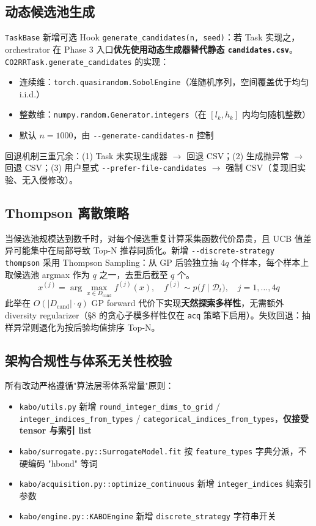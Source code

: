 \documentclass[12pt,a4paper]{article}
\begin{document}
\subsection{动态候选池生成}

\texttt{TaskBase} 新增可选 Hook \texttt{generate\_candidates(n, seed)}：若 Task 实现之，orchestrator 在 Phase 3 入口\textbf{优先使用动态生成器替代静态 \texttt{candidates.csv}}。\texttt{CO2RRTask.generate\_candidates} 的实现：
\begin{itemize}
    \item 连续维：\texttt{torch.quasirandom.SobolEngine}（准随机序列，空间覆盖优于均匀 i.i.d.）
    \item 整数维：\texttt{numpy.random.Generator.integers}（在 $[l_k, h_k]$ 内均匀随机整数）
    \item 默认 $n = 1000$，由 \texttt{-{}-generate-candidates-n} 控制
\end{itemize}

回退机制三重冗余：(1) Task 未实现生成器 $\to$ 回退 CSV；(2) 生成抛异常 $\to$ 回退 CSV；(3) 用户显式 \texttt{-{}-prefer-file-candidates} $\to$ 强制 CSV（复现旧实验、无入侵修改）。

\subsection{Thompson 离散策略}

当候选池规模达到数千时，对每个候选重复计算采集函数代价昂贵，且 UCB 值差异可能集中在局部导致 Top-N 推荐同质化。新增 \texttt{-{}-discrete-strategy thompson} 采用 Thompson Sampling\cite{kandasamy2018parallel}：从 GP 后验独立抽 $4q$ 个样本，每个样本上取候选池 argmax 作为 $q$ 之一，去重后截至 $q$ 个。
\begin{equation}
    x^{(j)} = \arg\max_{x \in D_{\text{cand}}} f^{(j)}(x), \quad f^{(j)} \sim p\bigl(f \mid \mathcal{D}_t\bigr), \quad j = 1, \ldots, 4q
\end{equation}
此举在 $O(|D_{\text{cand}}| \cdot q)$ GP forward 代价下实现\textbf{天然探索多样性}，无需额外 diversity regularizer（§8 的贪心子模多样性仅在 \texttt{acq} 策略下启用）。失败回退：抽样异常则退化为按后验均值排序 Top-N。

\subsection{架构合规性与体系无关性校验}

所有改动严格遵循"算法层零体系常量"原则：
\begin{itemize}
    \item \texttt{kabo/utils.py} 新增 \texttt{round\_integer\_dims\_to\_grid} / \texttt{integer\_indices\_from\_types} / \texttt{categorical\_indices\_from\_types}，\textbf{仅接受 tensor 与索引 list}
    \item \texttt{kabo/surrogate.py::SurrogateModel.fit} 按 \texttt{feature\_types} 字典分派，不硬编码 "hbond" 等词
    \item \texttt{kabo/acquisition.py::optimize\_continuous} 新增 \texttt{integer\_indices} 纯索引参数
    \item \texttt{kabo/engine.py::KABOEngine} 新增 \texttt{discrete\_strategy} 字符串开关
\end{itemize}
\end{document}
